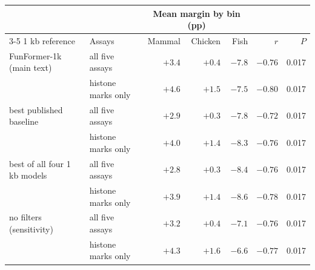 \begin{tabular}{l l r r r r r}
\toprule
 &  & \multicolumn{3}{c}{Mean margin by bin (pp)} &  &  \\
\cmidrule(lr){3-5}
1 kb reference & Assays & Mammal & Chicken & Fish & $r$ & $P$ \\
\midrule
FunFormer-1k (main text) & all five assays & $+3.4$ & $+0.4$ & $-7.8$ & $-0.76$ & 0.017 \\
 & histone marks only & $+4.6$ & $+1.5$ & $-7.5$ & $-0.80$ & 0.017 \\
\addlinespace
best published baseline & all five assays & $+2.9$ & $+0.3$ & $-7.8$ & $-0.72$ & 0.017 \\
 & histone marks only & $+4.0$ & $+1.4$ & $-8.3$ & $-0.76$ & 0.017 \\
\addlinespace
best of all four 1 kb models & all five assays & $+2.8$ & $+0.3$ & $-8.4$ & $-0.76$ & 0.017 \\
 & histone marks only & $+3.9$ & $+1.4$ & $-8.6$ & $-0.78$ & 0.017 \\
\addlinespace
no filters (sensitivity) & all five assays & $+3.2$ & $+0.4$ & $-7.1$ & $-0.76$ & 0.017 \\
 & histone marks only & $+4.3$ & $+1.6$ & $-6.6$ & $-0.77$ & 0.017 \\
\bottomrule
\end{tabular}
